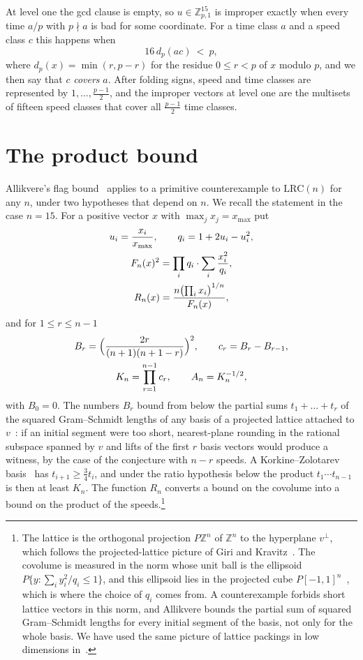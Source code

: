 \documentclass[aps,prd,twocolumn,superscriptaddress,nofootinbib,longbibliography,floatfix,showkeys,amsmath,amssymb,10pt]{revtex4-2}
\theoremstyle{definition}
\theoremstyle{remark}
\newcommand{\Z}{\mathbb{Z}}
\newcommand{\LRC}{\mathrm{LRC}}
\begin{document}
At level one the gcd clause is empty, so $u\in\Z_{p,1}^{15}$ is improper
exactly when every time $a/p$ with $p\nmid a$ is bad for some coordinate. For
a time class $a$ and a speed class $c$ this happens when
\begin{equation}\label{eq:cover}
 16\,d_p(ac)\ <\ p,
\end{equation}
where $d_p(x)=\min(r,p-r)$ for the residue $0\le r<p$ of $x$ modulo $p$,
and we then say that $c$ \emph{covers} $a$. After folding signs, speed and
time classes are represented by $1,\dots,\frac{p-1}2$, and the improper
vectors at level one are the multisets of fifteen speed classes that cover
all $\frac{p-1}2$ time classes.

\section{The product bound}\label{sec:shape}

Allikvere's flag bound~\cite[Theorem~3.8]{All26} applies to a primitive
counterexample to $\LRC(n)$ for any $n$, under two hypotheses that depend on
$n$. We recall the statement in the case $n=15$. For a positive vector
$x$ with $\max_jx_j=x_{\max}$ put
\begin{gather}
 u_i=\frac{x_i}{x_{\max}},\qquad q_i=1+2u_i-u_i^2,\notag\\
 F_n(x)^2=\prod_iq_i\cdot\sum_i\frac{x_i^2}{q_i},\notag\\
 R_n(x)=\frac{n\bigl(\prod_ix_i\bigr)^{1/n}}{F_n(x)},\label{eq:R}
\end{gather}
and for $1\le r\le n-1$
\begin{gather*}
 B_r=\Bigl(\frac{2r}{(n+1)(n+1-r)}\Bigr)^2,\qquad c_r=B_r-B_{r-1},\\
 K_n=\prod_{r=1}^{n-1}c_r,\qquad A_n=K_n^{-1/2},
\end{gather*}
with $B_0=0$. The numbers $B_r$ bound from below the partial sums
$t_1+\dots+t_r$ of the squared Gram--Schmidt lengths of any basis of a
projected lattice attached to $v$~\cite[Proposition~3.4]{All26}: if an
initial segment were too short, nearest-plane rounding in the rational
subspace spanned by $v$ and lifts of the first $r$ basis vectors would
produce a witness, by the case of the conjecture with $n-r$ speeds. A
Korkine--Zolotarev basis~\cite{KZ1873,LLS90} has $t_{i+1}\ge\frac34t_i$,
and under the ratio hypothesis below the product $t_1\cdots t_{n-1}$ is
then at least $K_n$. The function $R_n$
converts a bound on the covolume into a bound on the product of the
speeds.\footnote{The lattice is the orthogonal projection $P\Z^n$ of
$\Z^n$ to the hyperplane $v^\perp$, which follows the projected-lattice
picture of Giri and Kravitz~\cite{GK26}. The covolume is measured in the
norm whose unit ball is the ellipsoid $P\{y:\sum_iy_i^2/q_i\le1\}$, and
this ellipsoid lies in the projected cube $P[-1,1]^n$~\cite[Lemma~3.1]{All26},
which is where the choice of $q_i$ comes from. A counterexample forbids
short lattice vectors in this norm, and Allikvere bounds the partial sum
of squared Gram--Schmidt lengths for every initial segment of the basis,
not only for the whole basis. We have used the same picture of
lattice packings in low dimensions
in~\cite{BBB26a,BBB26b}.}
\end{document}
